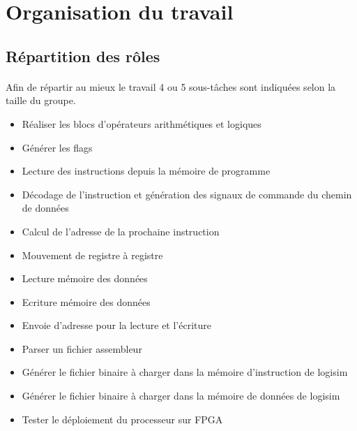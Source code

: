 \section{Organisation du travail}
\subsection{Répartition des rôles}

\paragraph{}
	Afin de répartir au mieux le travail 4 ou 5 sous-tâches sont indiquées selon la taille du groupe.


\begin{itemize}
	\item Réaliser les blocs d'opérateurs arithmétiques et logiques
	\item Générer les flags
\end{itemize}


\begin{itemize}
	\item Lecture des instructions depuis la mémoire de programme 
	\item Décodage de l'instruction et génération des signaux de commande du chemin de données
	\item Calcul de l'adresse de la prochaine instruction
\end{itemize}


\begin{itemize}
	\item Mouvement de registre à registre
 	\item Lecture mémoire des données
	\item Ecriture mémoire des données
	\item Envoie d'adresse pour la lecture et l'écriture
\end{itemize}


\begin{itemize}
	\item Parser un fichier assembleur 
	\item Générer le fichier binaire à charger dans la mémoire d'instruction de logisim
	\item Générer le fichier binaire à charger dans la mémoire de données de logisim
\end{itemize}


\begin{itemize}
	\item Tester le déploiement du processeur sur FPGA 
\end{itemize}
